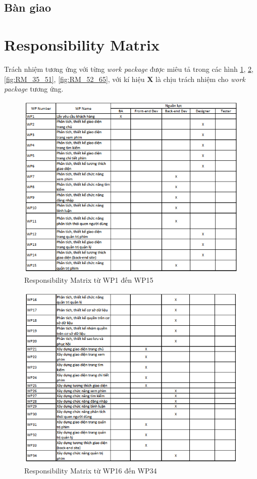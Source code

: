 \documentclass[a4paper]{book}
\begin{document}
\subsection{Bàn giao}
\section{Responsibility Matrix}
Trách nhiệm tương ứng với từng \textit{work package} được miêu tả trong các hình \ref{fig:RM_1_15}, \ref{fig:RM_16_34}, \ref{fig:RM_35_51}, \ref{fig:RM_52_65}, với kí hiệu \textbf{X} là chịu trách nhiệm cho \textit{work package} tương ứng.
\begin{figure}
	\centering
	\includegraphics[width=0.7\textheight]{RM_1_15.png}
	\caption{Responsibility Matrix từ WP1 đến WP15}
	\label{fig:RM_1_15}
\end{figure}
\begin{figure}
	\centering
	\includegraphics[width=0.7\textheight]{RM_16_34.png}
	\caption{Responsibility Matrix từ WP16 đến WP34}
	\label{fig:RM_16_34}
\end{figure}
\end{document}
